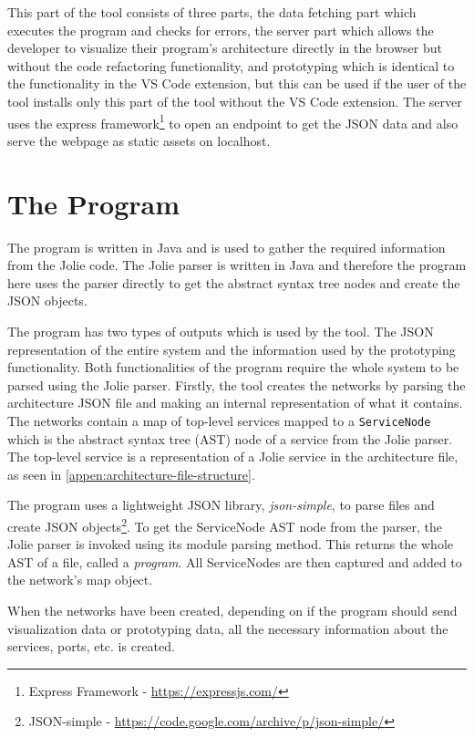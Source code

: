 This part of the tool consists of three parts, the data fetching part which executes the \javatoolname[] program and checks for errors, the server part which allows the developer to visualize their program's architecture directly in the browser but without the code refactoring functionality, and
prototyping which is identical to the functionality in the VS Code extension, but this can be used if the user of the tool installs only this part of the tool without the VS Code extension.
The server uses the express framework\footnote{Express Framework - \url{https://expressjs.com/}} to open an endpoint to get the JSON data and also serve the webpage as static assets on localhost.

\section{The \javatoolname[] Program}
The \javatoolname[] program is written in Java and is used to gather the required information from the Jolie code. The Jolie parser is written in Java and therefore the \javatoolname[] program here uses the parser directly to get the abstract syntax tree nodes and create the JSON objects.

The \javatoolname[] program has two types of outputs which is used by the tool. The JSON representation of the entire system and the information used by the prototyping functionality. Both functionalities of the \javatoolname[] program require the whole system to be parsed using the Jolie parser.
Firstly, the tool creates the networks by parsing the architecture JSON file and making an internal representation of what it contains. The networks contain a map of top-level services mapped to a \texttt{ServiceNode} which is the abstract syntax tree (AST) node of a service from the Jolie parser. The top-level service is a representation of a Jolie service in the architecture file, as seen in \cref{appen:architecture-file-structure}.

The \javatoolname[] program uses a lightweight JSON library, \textit{json-simple}, to parse files and create JSON objects\footnote{JSON-simple - \url{https://code.google.com/archive/p/json-simple/}}.
To get the ServiceNode AST node from the parser, the Jolie parser is invoked using its module parsing method. This returns the whole AST of a file, called a \textit{program}. All ServiceNodes are then captured and added to the network's map object.

When the networks have been created, depending on if the program should send visualization data or prototyping data, all the necessary information about the services, ports, etc. is created.
